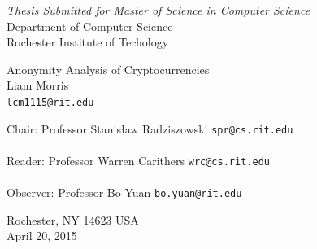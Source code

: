 \documentclass[11pt]{article}
\begin{document}
\thispagestyle{empty}
\begin{center}
    \begin{Large}
        \emph{Thesis Submitted for Master of Science in Computer Science} \\
        Department of Computer Science \\
        Rochester Institute of Techology \\
    \end{Large}
    \vspace{4em}
    {\huge Anonymity Analysis of Cryptocurrencies} \\
    \vspace{3em}
    {\LARGE Liam Morris} \\
    {\tt lcm1115@rit.edu} \\
    \vspace{3em}
    \begin{adjustwidth}{.5in}{.5in}
        Chair: Professor Stanis{\l}aw Radziszowski \hfill {\tt spr@cs.rit.edu} \\
        \vspace{2em}
        \hrulefill \\
        \vspace{3em}
        Reader: Professor Warren Carithers \hfill {\tt wrc@cs.rit.edu} \\
        \vspace{2em}
        \hrulefill \\
        \vspace{3em} Observer: Professor Bo Yuan \hfill {\tt bo.yuan@rit.edu} \\
        \vspace{2em}
        \hrulefill
    \end{adjustwidth}
    \vspace{2em} Rochester, NY 14623 USA \\
    \vspace{2em}
    April 20, 2015
\end{center}
\pagebreak
\thispagestyle{empty}
\end{document}
